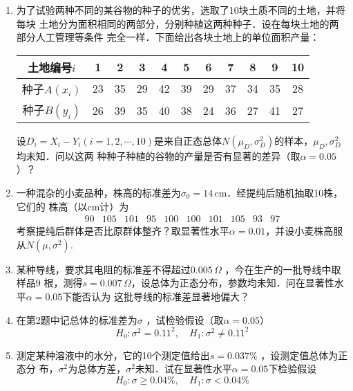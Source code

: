 \documentclass[10pt,a4paper]{article}
\begin{document}
\begin{enumerate}
    \item 为了试验两种不同的某谷物的种子的优劣，选取了10块土质不同的土地，并将每块
    土地分为面积相同的两部分，分别种植这两种种子．设在每块土地的两部分人工管理等条件
    完全一样．下面给出各块土地上的单位面积产量：
    \renewcommand{\arraystretch}{1.3}
    \begin{table}[H]\centering
        \begin{tabular}{c|cccccccccc}
        \hline
        土地编号$i$    & 1  & 2  & 3  & 4  & 5  & 6  & 7  & 8  & 9  & 10 \\ \hline
        种子$A(x_i)$ & 23 & 35 & 29 & 42 & 39 & 29 & 37 & 34 & 35 & 28 \\ \hline
        种子$B(y_i)$ & 26 & 39 & 35 & 40 & 38 & 24 & 36 & 27 & 41 & 27 \\ \hline
        \end{tabular}
    \end{table}
    \renewcommand{\arraystretch}{1.0}
    设$D_i=X_i-Y_i(i=1,2,\cdots,10)$是来自正态总体$N(\mu_D,\sigma^2_D)$的样本，$\mu_D,\sigma^2_D$均未知．问以这两
    种种子种植的谷物的产量是否有显著的差异（取$\alpha=0.05$）？




    \item 一种混杂的小麦品种，株高的标准差为$\sigma_0=14\, \mathrm{cm}$．经提纯后随机抽取10株，它们的
    株高（以cm计）为
    $$\begin{array}{cccccccccc}
        90 & 105 & 101 & 95  & 100 & 100 & 101 & 105 &  93 & 97
    \end{array}$$
    考察提纯后群体是否比原群体整齐？取显著性水平$\alpha=0.01$，并设小麦株高服从$N(\mu,\sigma^2)$.




    \item 某种导线，要求其电阻的标准差不得超过$0.005\, \Omega$ ，今在生产的一批导线中取样品9
    根，测得$s=0.007\, \Omega$，设总体为正态分布，参数均未知．问在显著性水平$\alpha=0.05$下能否认为
    这批导线的标准差显著地偏大？



    \item 在第2题中记总体的标准差为$\sigma$ ，试检验假设（取$\alpha=0.05$）
    $$H_0:\sigma^2=0.11^2,\quad H_1:\sigma^2\neq 0.11^2$$




    \item 测定某种溶液中的水分，它的10个测定值给出$s=0.037\%$ ，设测定值总体为正态分
    布，$\sigma^2$为总体方差，$\sigma^2$未知．试在显著性水平$\alpha=0.05$下检验假设
    $$H_0:\sigma\geq 0.04\%,\quad H_1:\sigma<0.04\%$$





\end{enumerate}
\end{document}
